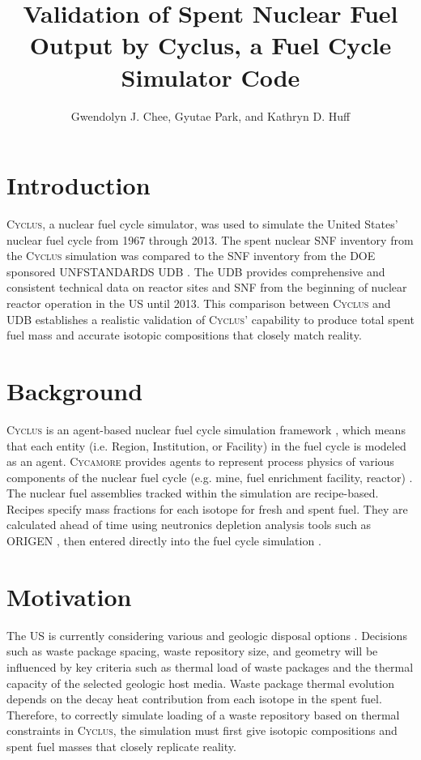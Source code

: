 \documentclass{anstrans}
\title{Validation of Spent Nuclear Fuel Output by Cyclus, a Fuel Cycle Simulator Code}
\author{Gwendolyn J. Chee, Gyutae Park, and Kathryn D. Huff}
\institute{
Dept. of Nuclear, Plasma and Radiological Engineering, University of Illinois at Urbana-Champaign \\
gchee2@illinois.edu
}
\newcommand{\Cyclus}{\textsc{Cyclus}\xspace}%
\newcommand{\Cycamore}{\textsc{Cycamore}\xspace}%
\begin{document}
\section{Introduction}
\Cyclus \cite{carlsen_cyclus_2014}, a nuclear fuel cycle simulator, was used to simulate the
United States' nuclear fuel cycle from 1967 through 2013. The spent nuclear 
\gls{SNF} inventory from the \Cyclus simulation was compared to the \gls{SNF} 
inventory from the \gls{DOE} sponsored \gls{UNFSTANDARDS} \gls{UDB} 
\cite{peterson_unf-st&dards_2017}. The \gls{UDB} provides comprehensive and 
consistent technical data on reactor sites and \gls{SNF} from the beginning of 
nuclear reactor operation in the \gls{US} until 2013. This comparison 
between \Cyclus and \gls{UDB} establishes a realistic validation of \Cyclus' 
capability to produce total spent fuel mass and accurate isotopic compositions 
that closely match reality.

\section{Background}
\Cyclus is an agent-based nuclear fuel cycle simulation framework 
\cite{huff_fundamental_2016}, which means that each entity (i.e. Region, 
Institution, or Facility) in the fuel cycle is modeled as an agent. 
\Cycamore \cite{carlsen_cycamore_2014} provides agents to represent process 
physics of various components of the nuclear fuel cycle (e.g. mine, fuel 
enrichment facility, reactor) \cite{huff_extensions_2014}. The nuclear fuel 
assemblies tracked within the simulation are recipe-based. Recipes specify mass 
fractions for each isotope for fresh and spent fuel. They are calculated ahead 
of time using neutronics depletion analysis tools such as ORIGEN 
\cite{bell_origen_1973}, then entered directly into the fuel cycle simulation 
\cite{peterson_additional_2017}. 

\section{Motivation}
The \gls{US} is currently considering various and geologic disposal 
options \cite{DOE_strategy_2013}. Decisions such as waste package spacing, 
waste repository size, and geometry will be influenced by key criteria such as 
thermal load of waste packages and the thermal capacity of the selected 
geologic host media. Waste package thermal evolution depends on the decay heat 
contribution from each isotope in the spent fuel. Therefore, to correctly 
simulate loading of a waste repository based on thermal constraints in \Cyclus, 
the simulation must first give isotopic compositions and spent fuel masses that 
closely replicate reality. 
\end{document}

